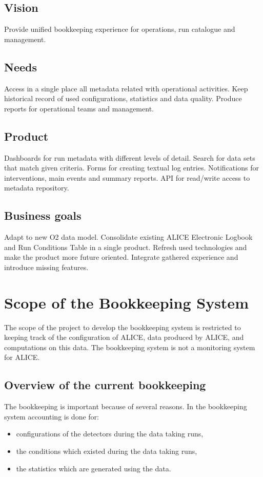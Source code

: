 \subsection{Vision}
Provide unified bookkeeping experience for operations, run catalogue and management.

\subsection{Needs}
Access in a single place all metadata related with operational activities. Keep historical record of used configurations, statistics and data quality. Produce reports for operational teams and management. 

\subsection{Product}
Dashboards for run metadata with different levels of detail. Search for data sets that match given criteria. Forms for creating textual log entries. Notifications for interventions, main events and summary reports. API for read/write access to metadata repository. 


\subsection{Business goals}
Adapt to new O2 data model. Consolidate existing ALICE Electronic Logbook and Run Conditions Table in a single product. Refresh used technologies and make the product more future oriented. Integrate gathered experience and introduce missing features. 



\section{Scope of the Bookkeeping System}
The scope of the project to develop the bookkeeping system is restricted to keeping track of the configuration of ALICE, data produced by ALICE, and computations on this data. The bookkeeping system is not a monitoring system for ALICE.


\subsection{Overview of the current bookkeeping}

The bookkeeping is important because of several reasons. In the bookkeeping system accounting is done for:
\begin{itemize}
  \item configurations of the detectors during the data taking runs,
  \item the conditions which existed during the data taking runs,
  \item the statistics which are generated using the data.
\end{itemize}

